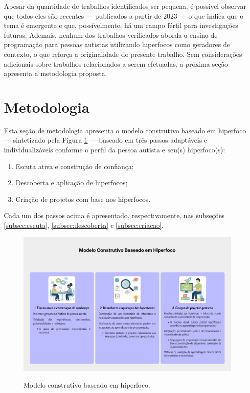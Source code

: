 \documentclass[
  12pt,
  a4paper,
]{article}
\providecommand{\tightlist}{%
  \setlength{\itemsep}{0pt}\setlength{\parskip}{0pt}}
\begin{document}
Apesar da quantidade de trabalhos identificados ser pequena, é possível
observar que todos eles são recentes --- publicados a partir de 2023 ---
o que indica que o tema é emergente e que, possívelmente, há um campo
fértil para investigações futuras. Ademais, nenhum dos trabalhos
verificados aborda o ensino de programação para pessoas autistas
utilizando hiperfocos como geradores de contexto, o que reforça a
originalidade do presente trabalho. Sem considerações adicionais sobre
trabalhos relacionados a serem efetuadas, a próxima seção apresenta a
metodologia proposta.

\hypertarget{sec:metodologia}{%
\section{Metodologia}\label{sec:metodologia}}

Esta seção de metodologia apresenta o modelo construtivo baseado em
hiperfoco --- sintetizado pela Figura \ref{fig:modelohiperfocos} ---
baseado em três passos adaptáveis e individualizáveis conforme o perfil
da pessoa autista e seu(s) hiperfoco(s):

\begin{enumerate}
\def\labelenumi{\arabic{enumi}.}
\tightlist
\item
  Escuta ativa e construção de confiança;
\item
  Descoberta e aplicação de hiperfocos;
\item
  Criação de projetos com base nos hiperfocos.
\end{enumerate}

Cada um dos passos acima é apresentado, respectivamente, nas subseções
\ref{subsec:escuta}, \ref{subsec:descoberta} e \ref{subsec:criacao}.

\begin{figure}[H]
  \centering
  \caption{Modelo construtivo baseado em hiperfoco.}
  \includegraphics[width=1.0\textwidth]{./images/modelo_construtivo_hiperfoco.png}
  \label{fig:modelohiperfocos}
\end{figure}
\end{document}
